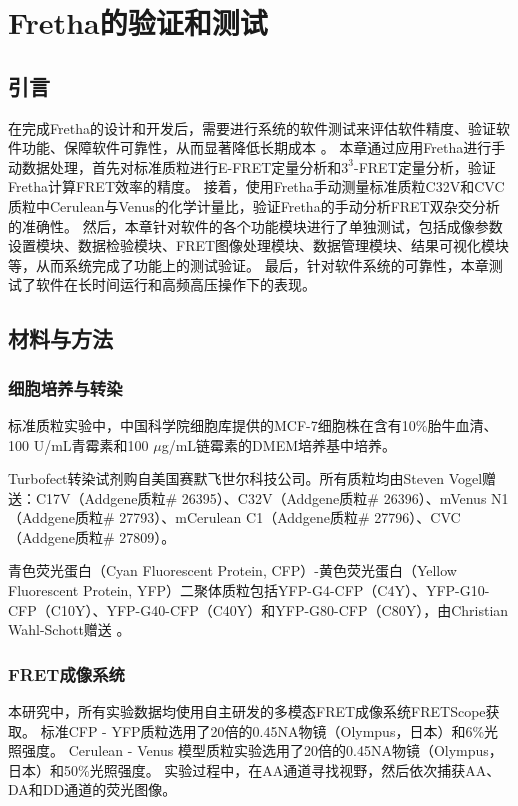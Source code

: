 \chapter{Fretha的验证和测试}

\section{引言}
在完成Fretha的设计和开发后，需要进行系统的软件测试来评估软件精度、验证软件功能、保障软件可靠性，从而显著降低长期成本 。
本章通过应用Fretha进行手动数据处理，首先对标准质粒进行E-FRET定量分析和$3^3$-FRET定量分析，验证Fretha计算FRET效率的精度。
接着，使用Fretha手动测量标准质粒C32V和CVC质粒中Cerulean与Venus的化学计量比，验证Fretha的手动分析FRET双杂交分析的准确性。
然后，本章针对软件的各个功能模块进行了单独测试，包括成像参数设置模块、数据检验模块、FRET图像处理模块、数据管理模块、结果可视化模块等，从而系统完成了功能上的测试验证。
最后，针对软件系统的可靠性，本章测试了软件在长时间运行和高频高压操作下的表现。

\section{材料与方法}
\subsection{细胞培养与转染}
\label{sec:细胞质粒}
标准质粒实验中，中国科学院细胞库提供的MCF-7细胞株在含有10\%胎牛血清、100 U/mL青霉素和100 $\mu$g/mL链霉素的DMEM培养基中培养。

Turbofect\texttrademark{}转染试剂购自美国赛默飞世尔科技公司。所有质粒均由Steven Vogel赠送：C17V（Addgene质粒\# 26395）、C32V（Addgene质粒\# 26396）、mVenus N1（Addgene质粒\# 27793）、mCerulean C1（Addgene质粒\# 27796）、CVC（Addgene质粒\# 27809）。

青色荧光蛋白（Cyan Fluorescent Protein, CFP）-黄色荧光蛋白（Yellow Fluorescent Protein, YFP）二聚体质粒包括YFP-G4-CFP（C4Y）、YFP-G10-CFP（C10Y）、YFP-G40-CFP（C40Y）和YFP-G80-CFP（C80Y），由Christian Wahl-Schott赠送 。

\subsection{FRET成像系统}
\label{sec:成像条件}
本研究中，所有实验数据均使用自主研发的多模态FRET成像系统FRETScope获取。
标准CFP - YFP质粒选用了20倍的0.45NA物镜（Olympus，日本）和6\%光照强度。
Cerulean - Venus 模型质粒实验选用了20倍的0.45NA物镜（Olympus，日本）和50\%光照强度。
实验过程中，在AA通道寻找视野，然后依次捕获AA、DA和DD通道的荧光图像。

